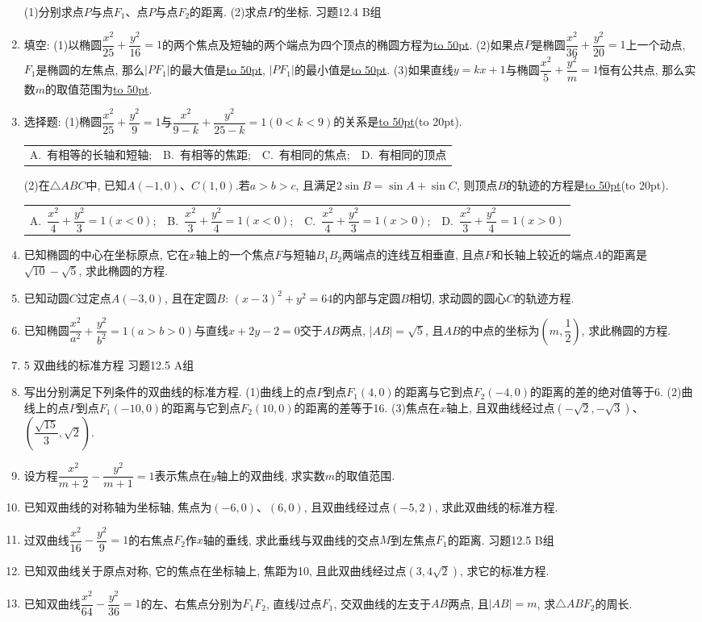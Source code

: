 \documentclass[10pt,a4paper]{article}
\newcommand{\blank}[1]{\underline{\hbox to #1pt{}}}
\newcommand{\bracket}[1]{(\hbox to #1pt{})}
\newcommand{\fourch}[4]{\par\begin{tabular}{p{.23\textwidth}p{.23\textwidth}p{.23\textwidth}p{.23\textwidth}}
A.~#1 &B.~#2& C.~#3& D.~#4
\end{tabular}}
\begin{document}
\begin{enumerate}[1.]
(1)分别求点$P$与点$F_1$、点$P$与点$F_2$的距离.
(2)求点$P$的坐标.
习题12.4  B组
\item 填空:
(1)以椭圆$\dfrac{x^2}{25}+\dfrac{y^2}{16}=1$的两个焦点及短轴的两个端点为四个顶点的椭圆方程为\blank{50}.
(2)如果点$P$是椭圆$\dfrac{x^2}{36}+\dfrac{y^2}{20}=1$上一个动点, $F_1$是椭圆的左焦点, 那么$|PF_1|$的最大值是\blank{50}, $|PF_1|$的最小值是\blank{50}.
(3)如果直线$y=kx+1$与椭圆$\dfrac{x^2}5+\dfrac{y^2}m=1$恒有公共点, 那么实数$m$的取值范围为\blank{50}.
\item 选择题:
(1)椭圆$\dfrac{x^2}{25}+\dfrac{y^2}9=1$与$\dfrac{x^2}{9-k}+\dfrac{y^2}{25-k}=1(0<k<9)$的关系是\blank{50}\bracket{20}.
\fourch{有相等的长轴和短轴;}{有相等的焦距;}{有相同的焦点;}{有相同的顶点}
(2)在$\triangle ABC$中, 已知$A(-1,0)$、$C(1,0)$.若$a>b>c$, 且满足$2\sin B=\sin A+\sin C$, 则顶点$B$的轨迹的方程是\blank{50}\bracket{20}.
\fourch{$\dfrac{x^2}4+\dfrac{y^2}3=1(x<0)$;}{$\dfrac{x^2}3+\dfrac{y^2}4=1(x<0)$;}{$\dfrac{x^2}4+\dfrac{y^2}3=1(x>0)$;}{$\dfrac{x^2}3+\dfrac{y^2}4=1(x>0)$}
\item 已知椭圆的中心在坐标原点, 它在$x$轴上的一个焦点$F$与短轴$B_1B_2$两端点的连线互相垂直, 且点$F$和长轴上较近的端点$A$的距离是$\sqrt {10}-\sqrt 5$, 求此椭圆的方程.
\item 已知动圆$C$过定点$A(-3,0)$, 且在定圆$B$: $(x-3)^2+y^2=64$的内部与定圆$B$相切, 求动圆的圆心$C$的轨迹方程.
\item 已知椭圆$\dfrac{x^2}{a^2}+\dfrac{y^2}{b^2}=1(a>b>0)$与直线$x+2y-2=0$交于$AB$两点, $|AB|=\sqrt 5$, 且$AB$的中点的坐标为$(m,\dfrac 12)$, 求此椭圆的方程.
\item 5  双曲线的标准方程
习题12.5  A组
\item 写出分别满足下列条件的双曲线的标准方程.
(1)曲线上的点$P$到点$F_1(4,0)$的距离与它到点$F_2(-4,0)$的距离的差的绝对值等于6.
(2)曲线上的点$P$到点$F_1(-10,0)$的距离与它到点$F_2(10,0)$的距离的差等于16.
(3)焦点在$x$轴上, 且双曲线经过点$(-\sqrt 2,-\sqrt 3)$、$(\dfrac{\sqrt {15}}3,\sqrt 2)$.
\item 设方程$\dfrac{x^2}{m+2}-\dfrac{y^2}{m+1}=1$表示焦点在$y$轴上的双曲线, 求实数$m$的取值范围.
\item 已知双曲线的对称轴为坐标轴, 焦点为$(-6,0)$、$(6,0)$, 且双曲线经过点$(-5,2)$, 求此双曲线的标准方程.
\item 过双曲线$\dfrac{x^2}{16}-\dfrac{y^2}9=1$的右焦点$F_2$作$x$轴的垂线, 求此垂线与双曲线的交点$M$到左焦点$F_1$的距离.
习题12.5  B组
\item 已知双曲线关于原点对称, 它的焦点在坐标轴上, 焦距为10, 且此双曲线经过点$(3,4\sqrt 2)$, 求它的标准方程.
\item 已知双曲线$\dfrac{x^2}{64}-\dfrac{y^2}{36}=1$的左、右焦点分别为$F_1F_2$, 直线$l$过点$F_1$, 交双曲线的左支于$AB$两点, 且$|AB|=m$, 求$\triangle ABF_2$的周长.

\end{enumerate}
\end{document}
